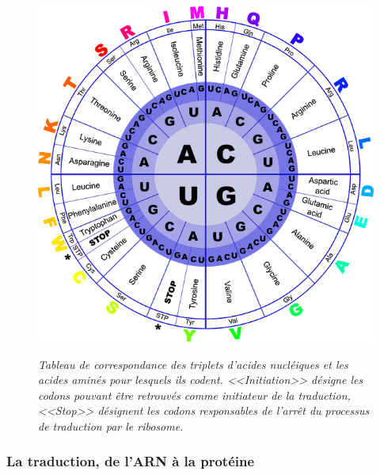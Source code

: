 \begin{figure}[htb]
  \centering
  {\includegraphics[width=0.55\linewidth]{./figures/ch1/codon_table_circle}}
    \caption[Tableau de correspondance des triplets d'acides nucléiques et les acides aminés.]{\it Tableau de correspondance des triplets d'acides nucléiques et les acides aminés pour lesquels ils codent. <<Initiation>> désigne les codons pouvant être retrouvés comme initiateur de la traduction, <<Stop>> désignent les codons responsables de l'arrêt du processus de traduction par le ribosome.}
    \label{Fig:codon_table}
  \hspace{0.2cm}
\end{figure}


\subsubsection{La traduction, de l'ARN à la protéine}



